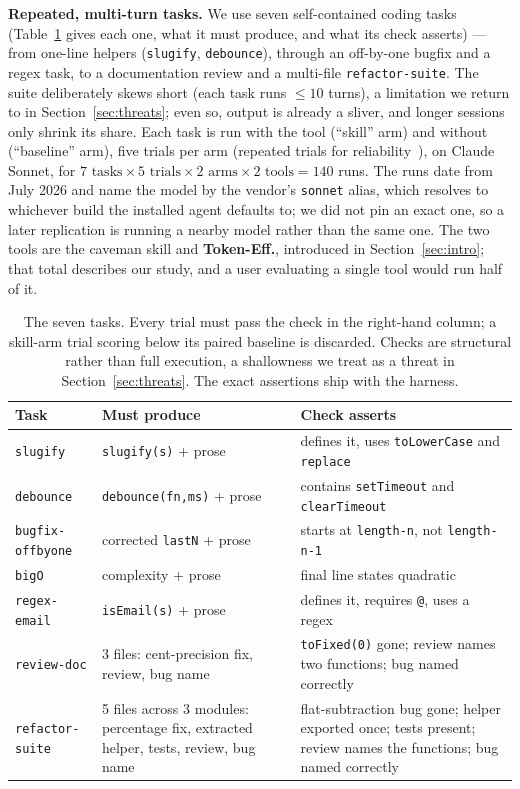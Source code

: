 \textbf{Repeated, multi-turn tasks.} We use seven self-contained coding tasks
(Table~\ref{tab:tasks} gives each one, what it must produce, and what its check asserts) --- from
one-line helpers (\texttt{slugify}, \texttt{debounce}), through an off-by-one bugfix and a regex
task, to a documentation review and a multi-file \texttt{refactor-suite}. The suite deliberately skews
short (each task runs ${\le}10$ turns), a limitation we return to in Section~\ref{sec:threats}; even so,
output is already a sliver, and longer sessions only shrink its share. Each task is run with the
tool (``skill'' arm) and without (``baseline'' arm), five trials per arm (repeated trials for
reliability~\cite{yao2024taubench}), on Claude Sonnet,
for $7\text{ tasks}\times5\text{ trials}\times2\text{ arms}\times2\text{ tools} = 140$ runs. The runs date
from July 2026 and name the model by the vendor's \texttt{sonnet} alias, which resolves to whichever
build the installed agent defaults to; we did not pin an exact one, so a later replication is running
a nearby model rather than the same one. The two
tools are the caveman skill and \textbf{Token-Eff.}, introduced in Section~\ref{sec:intro}; that total
describes our study, and a user evaluating a single tool would run half of it.

\begin{table}[t]
\centering
\caption{The seven tasks. Every trial must pass the check in the right-hand column; a skill-arm trial
scoring below its paired baseline is discarded. Checks are structural rather than full execution, a
shallowness we treat as a threat in Section~\ref{sec:threats}. The exact assertions ship with the harness.}
\label{tab:tasks}
\small
\setlength{\tabcolsep}{3pt}
\begin{tabular}{@{}lp{2.3cm}p{3.4cm}@{}}
\toprule
Task & Must produce & Check asserts \\
\midrule
\texttt{slugify} & \texttt{slugify(s)} + prose & defines it, uses \texttt{toLowerCase} and \texttt{replace} \\
\texttt{debounce} & \texttt{debounce(fn,ms)} + prose & contains \texttt{setTimeout} and \texttt{clearTimeout} \\
\texttt{bugfix-offbyone} & corrected \texttt{lastN} + prose & starts at \texttt{length-n}, not \texttt{length-n-1} \\
\texttt{bigO} & complexity + prose & final line states quadratic \\
\texttt{regex-email} & \texttt{isEmail(s)} + prose & defines it, requires \texttt{@}, uses a regex \\
\texttt{review-doc} & 3 files: cent-precision fix, review, bug name & \texttt{toFixed(0)} gone; review names two functions; bug named correctly \\
\texttt{refactor-suite} & 5 files across 3 modules: percentage fix, extracted helper, tests, review, bug name & flat-subtraction bug gone; helper exported once; tests present; review names the functions; bug named correctly \\
\bottomrule
\end{tabular}
\end{table}

